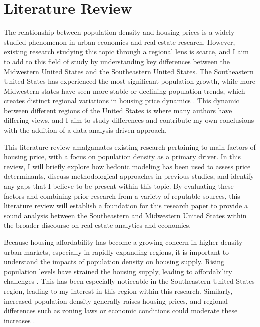 \documentclass[journal,article,submit,pdftex,moreauthors]{Definitions/mdpi}
\begin{document}

\section{Literature Review}

The relationship between population density and housing prices is a widely studied phenomenon in urban economics and real estate research. However, existing research studying this topic through a regional lens is scarce, and I aim to add to this field of study by understanding key differences between the Midwestern United States and the Southeastern United States. The Southeastern United States has experienced the most significant population growth, while more Midwestern states have seen more stable or declining population trends, which creates distinct regional variations in housing price dynamics \citep{_2024_net}. This dynamic between different regions of the United States is where many authors have differing views, and I aim to study differences and contribute my own conclusions with the addition of a data analysis driven approach.

This literature review amalgamates existing research pertaining to main factors of housing price, with a focus on population density as a primary driver. In this review, I will briefly explore how hedonic modeling has been used to assess price determinants, discuss methodological approaches in previous studies, and identify any gaps that I believe to be present within this topic. By evaluating these factors and combining prior research from a variety of reputable sources, this literature review will establish a foundation for this research paper to provide a sound analysis between the Southeastern and Midwestern United States within the broader discourse on real estate analytics and economics.

Because housing affordability has become a growing concern in higher density urban markets, especially in rapidly expanding regions, it is important to understand the impacts of population density on housing supply. Rising population levels have strained the housing supply, leading to affordability challenges \citep{desilver2024}. This has been especially noticeable in the Southeastern United States region, leading to my interest in this region within this research. Similarly, increased population density generally raises housing prices, and regional differences such as zoning laws or economic conditions could moderate these increases \citep{a2024_how}.
\end{document}
